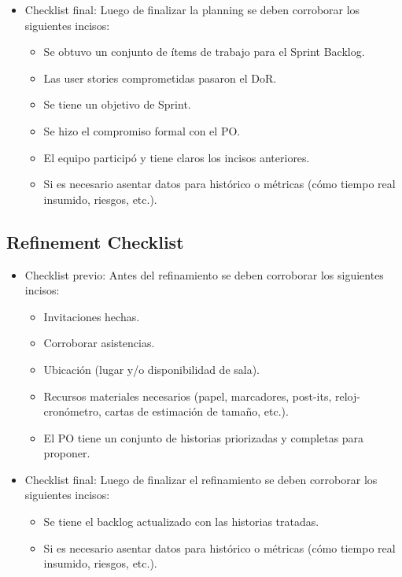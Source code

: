 \begin{itemize}
  \item {Checklist final: Luego de finalizar la planning se deben corroborar los siguientes incisos:
    \begin{itemize}
      \item Se obtuvo un conjunto de ítems de trabajo para el Sprint Backlog.
      \item Las user stories comprometidas pasaron el DoR.
      \item Se tiene un objetivo de Sprint.
      \item Se hizo el compromiso formal con el PO.
      \item El equipo participó y tiene claros los incisos anteriores.
      \item Si es necesario asentar datos para histórico o métricas (cómo tiempo real insumido, riesgos, etc.).   
   \end{itemize}
  }

\end{itemize}


\subsection{Refinement Checklist}

\begin{itemize}
  
  \item {Checklist previo: Antes del refinamiento se deben corroborar los siguientes incisos:
  
  \begin{itemize}
    \item Invitaciones hechas.
    \item Corroborar asistencias.
    \item Ubicación (lugar y/o disponibilidad de sala).
    \item Recursos materiales necesarios (papel, marcadores, post-its, reloj-cronómetro, cartas de estimación de tamaño, etc.).
    \item El PO tiene un conjunto de historias priorizadas y completas para proponer.
  \end{itemize}
  }
  
  \item {Checklist final: Luego de finalizar el refinamiento se deben corroborar los siguientes incisos:
    \begin{itemize}
      \item Se tiene el backlog actualizado con las historias tratadas.
      \item Si es necesario asentar datos para histórico o métricas (cómo tiempo real insumido, riesgos, etc.).
   \end{itemize}
  }

\end{itemize}

